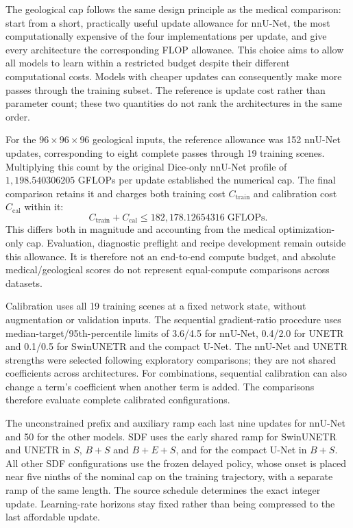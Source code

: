 \documentclass[12pt,a4paper]{article}
\begin{document}
The geological cap follows the same design principle as the medical
comparison: start from a short, practically useful update allowance for
nnU-Net, the most computationally expensive of the four implementations
per update, and give every architecture the corresponding FLOP allowance.
This choice aims to allow all models to learn within a restricted budget
despite their different computational costs. Models with cheaper updates
can consequently make more passes through the training subset. The
reference is update cost rather than parameter count; these two quantities
do not rank the architectures in the same order.

For the $96\times96\times96$ geological inputs, the reference allowance
was 152 nnU-Net updates, corresponding to eight complete passes through
19 training scenes. Multiplying this count by the original Dice-only
nnU-Net profile of $1{,}198.540306205$ GFLOPs per update established the
numerical cap. The final comparison retains it and charges both training
cost $C_{\mathrm{train}}$ and calibration cost $C_{\mathrm{cal}}$ within it:
\begin{equation}
 C_{\mathrm{train}}+C_{\mathrm{cal}}
 \leq 182{,}178.12654316\;\mathrm{GFLOPs}.
\label{eq:geological-compute-cap}
\end{equation}
This differs both in magnitude and accounting from the medical
optimization-only cap. Evaluation, diagnostic preflight and recipe
development remain outside this allowance. It is therefore not an
end-to-end compute budget, and absolute medical/geological scores do
not represent equal-compute comparisons across datasets.

Calibration uses all 19 training scenes at a fixed network state, without
augmentation or validation inputs. The sequential gradient-ratio procedure
uses median-target/95th-percentile limits of 3.6/4.5 for nnU-Net, 0.4/2.0
for UNETR and 0.1/0.5 for SwinUNETR and the compact U-Net. The nnU-Net and
UNETR strengths were selected following exploratory comparisons; they are
not shared coefficients across architectures. For combinations, sequential
calibration can also change a term's coefficient when another term is added.
The comparisons therefore evaluate complete calibrated configurations.

The unconstrained prefix and auxiliary ramp each last nine updates
for nnU-Net and 50 for the other models. SDF uses the early shared
ramp for SwinUNETR and UNETR in $S$, $B+S$ and $B+E+S$, and for
the compact U-Net in $B+S$. All other SDF configurations use the
frozen delayed policy, whose onset is placed near five ninths of the
nominal cap on the training trajectory, with a separate ramp of the
same length. The source schedule determines the exact integer update.
Learning-rate horizons stay fixed rather than being compressed to the
last affordable update.
\end{document}

